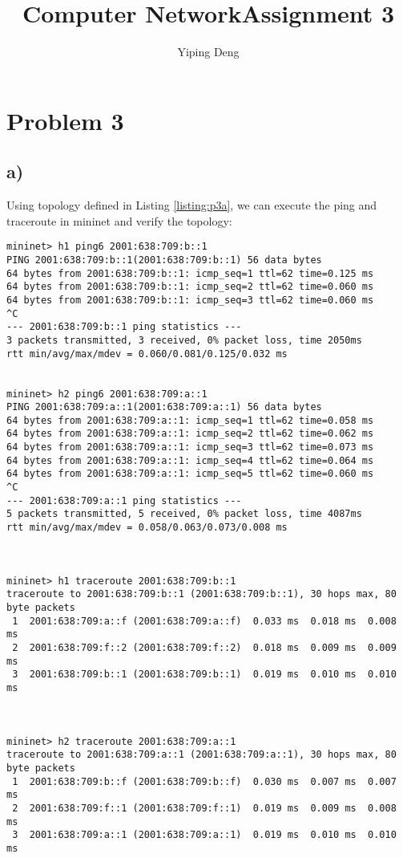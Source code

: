 \documentclass{article}
\newcommand{\coursename}{Computer Network}
\newcommand{\hwnumber}{3}
\begin{document}
\title{\coursename \thinspace Assignment \hwnumber}
\author{Yiping Deng}
\maketitle
\thispagestyle{fancy}

\section*{Problem 3}
\subsection*{a)}
Using topology defined in Listing \ref{listing:p3a}, we can execute the ping and
traceroute in mininet and verify the topology:
\begin{verbatim}
mininet> h1 ping6 2001:638:709:b::1
PING 2001:638:709:b::1(2001:638:709:b::1) 56 data bytes
64 bytes from 2001:638:709:b::1: icmp_seq=1 ttl=62 time=0.125 ms
64 bytes from 2001:638:709:b::1: icmp_seq=2 ttl=62 time=0.060 ms
64 bytes from 2001:638:709:b::1: icmp_seq=3 ttl=62 time=0.060 ms
^C
--- 2001:638:709:b::1 ping statistics ---
3 packets transmitted, 3 received, 0% packet loss, time 2050ms
rtt min/avg/max/mdev = 0.060/0.081/0.125/0.032 ms


mininet> h2 ping6 2001:638:709:a::1
PING 2001:638:709:a::1(2001:638:709:a::1) 56 data bytes
64 bytes from 2001:638:709:a::1: icmp_seq=1 ttl=62 time=0.058 ms
64 bytes from 2001:638:709:a::1: icmp_seq=2 ttl=62 time=0.062 ms
64 bytes from 2001:638:709:a::1: icmp_seq=3 ttl=62 time=0.073 ms
64 bytes from 2001:638:709:a::1: icmp_seq=4 ttl=62 time=0.064 ms
64 bytes from 2001:638:709:a::1: icmp_seq=5 ttl=62 time=0.060 ms
^C
--- 2001:638:709:a::1 ping statistics ---
5 packets transmitted, 5 received, 0% packet loss, time 4087ms
rtt min/avg/max/mdev = 0.058/0.063/0.073/0.008 ms



mininet> h1 traceroute 2001:638:709:b::1
traceroute to 2001:638:709:b::1 (2001:638:709:b::1), 30 hops max, 80 byte packets
 1  2001:638:709:a::f (2001:638:709:a::f)  0.033 ms  0.018 ms  0.008 ms
 2  2001:638:709:f::2 (2001:638:709:f::2)  0.018 ms  0.009 ms  0.009 ms
 3  2001:638:709:b::1 (2001:638:709:b::1)  0.019 ms  0.010 ms  0.010 ms



mininet> h2 traceroute 2001:638:709:a::1
traceroute to 2001:638:709:a::1 (2001:638:709:a::1), 30 hops max, 80 byte packets
 1  2001:638:709:b::f (2001:638:709:b::f)  0.030 ms  0.007 ms  0.007 ms
 2  2001:638:709:f::1 (2001:638:709:f::1)  0.019 ms  0.009 ms  0.008 ms
 3  2001:638:709:a::1 (2001:638:709:a::1)  0.019 ms  0.010 ms  0.010 ms
\end{verbatim}
\end{document}
